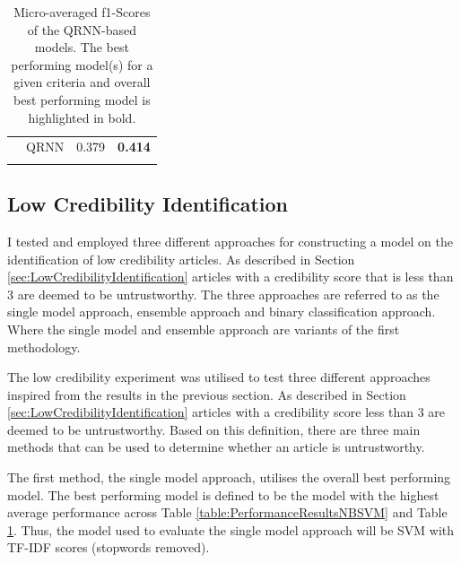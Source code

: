 \documentclass[a4paper,twoside,phd]{BYUPhys}
\begin{document}
\begin{table}[H]
{\begin{tabular}{|p{6cm}|p{2cm}|p{3cm}|p{3.3cm}|}
			
			\multirowcell{2}{\textbf{Average} \textbf{Performance}} 
			& QRNN & 0.379 & \textbf{0.414}      \\ 
			& & &      \\
			\hline                                                                                                                                          
	\end{tabular}}
	\caption{Micro-averaged f1-Scores of the QRNN-based models. The best performing model(s) for a given criteria and overall best performing model is highlighted in bold.}
	\label{table:PerformanceResultsQRNN}
\end{table}


\subsection{Low Credibility Identification}
\label{sec:LowCredibilityIdentificationResults}

I tested and employed three different approaches for constructing a model on the identification of low credibility articles. As described in Section \ref{sec:LowCredibilityIdentification} articles with a credibility score that is less than 3 are deemed to be untrustworthy. The three approaches are referred to as the single model approach, ensemble approach and binary classification approach. Where the single model and ensemble approach are variants of the first methodology.\newline

The low credibility experiment was utilised to test three different approaches inspired from the results in the previous section. As described in Section \ref{sec:LowCredibilityIdentification} articles with a credibility score less than 3 are deemed to be untrustworthy. Based on this definition, there are three main methods that can be used to determine whether an article is untrustworthy. \newline

The first method, the single model approach, utilises the overall best performing model. The best performing model is defined to be the model with the highest average performance across Table \ref{table:PerformanceResultsNBSVM} and Table \ref{table:PerformanceResultsQRNN}. Thus, the model used to evaluate the single model approach will be SVM with TF-IDF scores (stopwords removed). \newline
\end{document}
